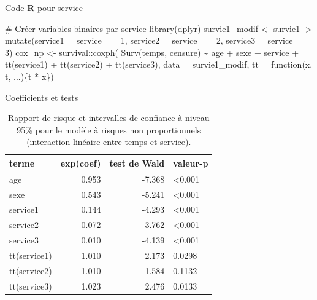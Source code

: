 \documentclass[
  ignorenonframetext,
]{beamer}
\newenvironment{Shaded}{\begin{snugshade}}{\end{snugshade}}
\newcommand{\AttributeTok}[1]{\textcolor[rgb]{0.40,0.45,0.13}{#1}}
\newcommand{\CommentTok}[1]{\textcolor[rgb]{0.37,0.37,0.37}{#1}}
\newcommand{\ControlFlowTok}[1]{\textcolor[rgb]{0.00,0.23,0.31}{#1}}
\newcommand{\DecValTok}[1]{\textcolor[rgb]{0.68,0.00,0.00}{#1}}
\newcommand{\FunctionTok}[1]{\textcolor[rgb]{0.28,0.35,0.67}{#1}}
\newcommand{\NormalTok}[1]{\textcolor[rgb]{0.00,0.23,0.31}{#1}}
\newcommand{\OtherTok}[1]{\textcolor[rgb]{0.00,0.23,0.31}{#1}}
\newcommand{\SpecialCharTok}[1]{\textcolor[rgb]{0.37,0.37,0.37}{#1}}
\begin{document}
\begin{frame}[fragile]{Code \textbf{R} pour service}
\protect\hypertarget{code-r-pour-service}{}
\begin{Shaded}
\begin{Highlighting}[numbers=left,,]
\CommentTok{\# Créer variables binaires par service}
\FunctionTok{library}\NormalTok{(dplyr)}
\NormalTok{survie1\_modif }\OtherTok{\textless{}{-}}\NormalTok{ survie1 }\SpecialCharTok{|\textgreater{}}
  \FunctionTok{mutate}\NormalTok{(}\AttributeTok{service1 =}\NormalTok{ service }\SpecialCharTok{==} \DecValTok{1}\NormalTok{,}
         \AttributeTok{service2 =}\NormalTok{ service }\SpecialCharTok{==} \DecValTok{2}\NormalTok{,}
         \AttributeTok{service3 =}\NormalTok{ service }\SpecialCharTok{==} \DecValTok{3}\NormalTok{)}
\NormalTok{cox\_np }\OtherTok{\textless{}{-}}\NormalTok{ survival}\SpecialCharTok{::}\FunctionTok{coxph}\NormalTok{(}
    \FunctionTok{Surv}\NormalTok{(temps, censure) }\SpecialCharTok{\textasciitilde{}} 
\NormalTok{     age }\SpecialCharTok{+}\NormalTok{ sexe }\SpecialCharTok{+}\NormalTok{ service }\SpecialCharTok{+} 
      \FunctionTok{tt}\NormalTok{(service1) }\SpecialCharTok{+} \FunctionTok{tt}\NormalTok{(service2) }\SpecialCharTok{+} \FunctionTok{tt}\NormalTok{(service3), }
     \AttributeTok{data =}\NormalTok{ survie1\_modif, }
     \AttributeTok{tt =} \ControlFlowTok{function}\NormalTok{(x, t, ...)\{t }\SpecialCharTok{*}\NormalTok{ x\})}
\end{Highlighting}
\end{Shaded}
\end{frame}

\begin{frame}{Coefficients et tests}
\protect\hypertarget{coefficients-et-tests}{}
\hypertarget{tbl-cox-nph}{}
\begin{table}
\caption{\label{tbl-cox-nph}Rapport de risque et intervalles de confiance à niveau 95\% pour le
modèle à risques non proportionnels (interaction linéaire entre temps et
service). }\tabularnewline

\centering
\begin{tabular}{lrrl}
\toprule
terme & exp(coef) & test de Wald & valeur-p\\
\midrule
age & 0.953 & -7.368 & <0.001\\
sexe & 0.543 & -5.241 & <0.001\\
service1 & 0.144 & -4.293 & <0.001\\
service2 & 0.072 & -3.762 & <0.001\\
service3 & 0.010 & -4.139 & <0.001\\
tt(service1) & 1.010 & 2.173 & 0.0298\\
tt(service2) & 1.010 & 1.584 & 0.1132\\
tt(service3) & 1.023 & 2.476 & 0.0133\\
\bottomrule
\end{tabular}
\end{table}
\end{frame}
\end{document}
